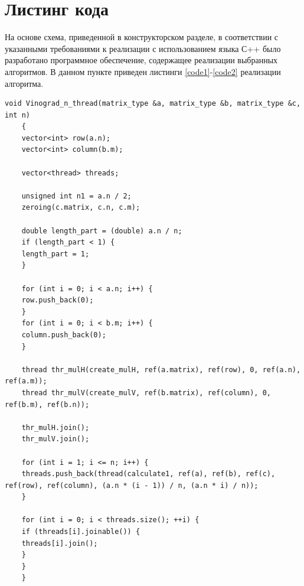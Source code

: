 \documentclass[12pt, a4paper]{report}
\begin{document}
	
	\section{Листинг кода}
	\hspace{0.6cm}На основе схема, приведенной в конструкторском разделе, в соответствии с указанными требованиями к реализации с использованием языка С++ было разработано программное обеспечение, содержащее реализации выбранных алгоритмов. В данном пункте приведен листинги \ref{code1}-\ref{code2} реализации алгоритма.

	\begin{lstlisting}[label=code1,caption=Реализация алгоритма Винограда]
	void Vinograd_n_thread(matrix_type &a, matrix_type &b, matrix_type &c, int n)
	{
	vector<int> row(a.n);
	vector<int> column(b.m);
	
	vector<thread> threads;
	
	unsigned int n1 = a.n / 2;
	zeroing(c.matrix, c.n, c.m);
	
	double length_part = (double) a.n / n;
	if (length_part < 1) {
	length_part = 1;
	}
	
	for (int i = 0; i < a.n; i++) {
	row.push_back(0);
	}
	for (int i = 0; i < b.m; i++) {
	column.push_back(0);
	}
	
	thread thr_mulH(create_mulH, ref(a.matrix), ref(row), 0, ref(a.n), ref(a.m));
	thread thr_mulV(create_mulV, ref(b.matrix), ref(column), 0, ref(b.m), ref(b.n));
	
	thr_mulH.join();
	thr_mulV.join();
	
	for (int i = 1; i <= n; i++) {
	threads.push_back(thread(calculate1, ref(a), ref(b), ref(c), ref(row), ref(column), (a.n * (i - 1)) / n, (a.n * i) / n));
	}
	
	for (int i = 0; i < threads.size(); ++i) {
	if (threads[i].joinable()) {
	threads[i].join();
	}
	}
	}
	
	\end{lstlisting}
\end{document}
